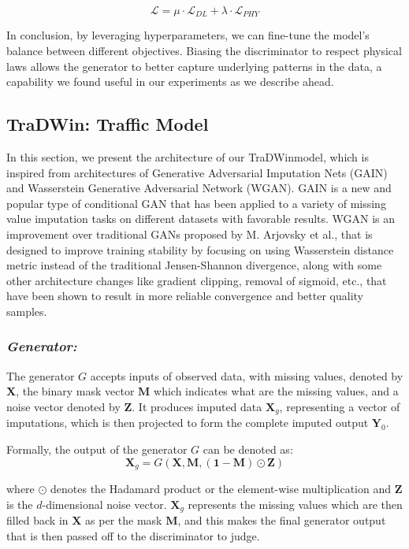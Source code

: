 \documentclass[conference]{IEEEtran}
\newcommand{\name}{TraDWin}
\begin{document}
\[ \mathcal{L} = \mu \cdot \mathcal{L}_{DL} + \lambda \cdot \mathcal{L}_{PHY} \]

In conclusion, by leveraging hyperparameters, we can fine-tune the model's balance between different objectives. Biasing the discriminator to respect physical laws allows the generator to better capture underlying patterns in the data, a capability we found useful in our experiments as we describe ahead.

\subsection{\name: Traffic Model}

In this section, we present the architecture of our \name model, which is inspired from architectures of Generative Adversarial Imputation Nets (GAIN)\cite{gain} and Wasserstein Generative Adversarial Network (WGAN)\cite{wgan}. GAIN is a new and popular type of conditional GAN that has been applied to a variety of missing value imputation tasks on different datasets with favorable results. WGAN is an improvement over traditional GANs proposed by M. Arjovsky et al., that is designed to improve training stability by focusing on using Wasserstein distance metric instead of the traditional Jensen-Shannon divergence, along with some other architecture changes like gradient clipping, removal of sigmoid, etc., that have been shown to result in more reliable convergence and better quality samples.

\subsubsection{\textit{Generator:}}

The generator \( G \) accepts inputs of observed data, with missing values, denoted by \( \mathbf{X} \), the binary mask vector \( \mathbf{M} \) which indicates what are the missing values, and a noise vector denoted by \( \mathbf{Z} \). It produces imputed data \( \mathbf{X}_g \), representing a vector of imputations, which is then projected to form the complete imputed output \( \mathbf{Y}_0 \). 

Formally, the output of the generator \( G \) can be denoted as: 
\[ \mathbf{X}_g = G(\mathbf{X}, \mathbf{M}, (\mathbf{1}-\mathbf{M}) \odot \mathbf{Z}) \]

where \( \odot \) denotes the Hadamard product or the element-wise multiplication and \( \mathbf{Z} \) is the \( d \)-dimensional noise vector. \( \mathbf{X}_g \) represents the missing values which are then filled back in \( \mathbf{X} \) as per the mask \( \mathbf{M} \), and this makes the final generator output that is then passed off to the discriminator to judge.
\end{document}
